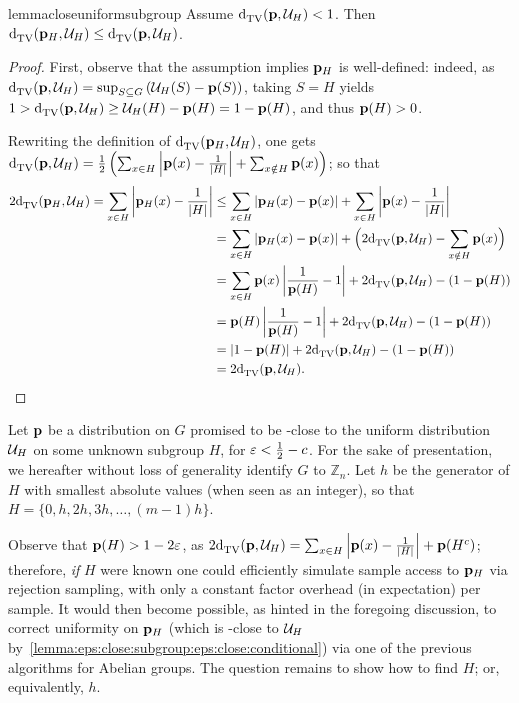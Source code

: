 \begin{restatable}{lemma}{closeuniformsubgroup}\label{lemma:eps:close:subgroup:eps:close:conditional}
Assume ${\operatorname{d}_{\textrm{TV}}^{}\!\left({\mathbf{p}, \mathcal{U}_H}\right)} < 1$. Then ${\operatorname{d}_{\textrm{TV}}^{}\!\left({\mathbf{p}_H, \mathcal{U}_H}\right)} \leq {\operatorname{d}_{\textrm{TV}}^{}\!\left({\ensuremath{\mathbf{p}}, \ensuremath{\mathcal{U}}_H}\right)}$.
\end{restatable}
\begin{proof}
  First, observe that the assumption implies $\mathbf{p}_H$ is well-defined: indeed, as 
  ${\operatorname{d}_{\textrm{TV}}^{}\!\left({\mathbf{p}, \mathcal{U}_H}\right)} = \sup_{S\subseteq G}\left( \mathcal{U}_H(S)-\mathbf{p}(S) \right)$, 
  taking $S=H$ yields $1 > {\operatorname{d}_{\textrm{TV}}^{}\!\left({\mathbf{p}, \mathcal{U}_H}\right)} \geq \mathcal{U}_H(H)-\mathbf{p}(H) = 1-\mathbf{p}(H)$, 
  and thus $\mathbf{p}(H) > 0$.

  Rewriting the definition of ${\operatorname{d}_{\textrm{TV}}^{}\!\left({\mathbf{p}_H, \mathcal{U}_H}\right)}$, one gets ${\operatorname{d}_{\textrm{TV}}^{}\!\left({\mathbf{p}, \mathcal{U}_H}\right)} = \frac{1}{2}\left( \sum_{x\in H} \left\lvert  \mathbf{p}(x) - \frac{1}{\left\lvert H \right\rvert}  \right\rvert + \sum_{x\notin H} \mathbf{p}(x)\right)$; so that
  \begin{align*}
    2{\operatorname{d}_{\textrm{TV}}^{}\!\left({\mathbf{p}_H, \mathcal{U}_H}\right)} = \sum_{x\in H} \left\lvert  \mathbf{p}_H(x) - \frac{1}{\left\lvert H \right\rvert}  \right\rvert 
    &\leq \sum_{x\in H} \left\lvert  \mathbf{p}_H(x) - \mathbf{p}(x)  \right\rvert  + \sum_{x\in H} \left\lvert  \mathbf{p}(x) - \frac{1}{\left\lvert H \right\rvert}  \right\rvert \\
    &= \sum_{x\in H} \left\lvert  \mathbf{p}_H(x) - \mathbf{p}(x)  \right\rvert  + \Big(2{\operatorname{d}_{\textrm{TV}}^{}\!\left({\mathbf{p}, \mathcal{U}_H}\right)} - \sum_{x\notin H} \mathbf{p}(x)\Big) \\
    &= \sum_{x\in H} \mathbf{p}(x)\left\lvert  \frac{1}{\mathbf{p}(H)} - 1  \right\rvert  + 2{\operatorname{d}_{\textrm{TV}}^{}\!\left({\mathbf{p}, \mathcal{U}_H}\right)} - \left(1-\mathbf{p}(H)\right) \\
    &= \mathbf{p}(H)\left\lvert  \frac{1}{\mathbf{p}(H)} - 1  \right\rvert  + 2{\operatorname{d}_{\textrm{TV}}^{}\!\left({\mathbf{p}, \mathcal{U}_H}\right)} - \left(1-\mathbf{p}(H)\right) \\
    &= \left\lvert 1-\mathbf{p}(H) \right\rvert + 2{\operatorname{d}_{\textrm{TV}}^{}\!\left({\mathbf{p}, \mathcal{U}_H}\right)} - \left(1-\mathbf{p}(H)\right)\\
    &= 2{\operatorname{d}_{\textrm{TV}}^{}\!\left({\mathbf{p}, \mathcal{U}_H}\right)}.
  \end{align*}
\end{proof}

Let $\mathbf{p}$ be a distribution on $G$ promised to be \eps-close to the uniform distribution $\mathcal{U}_H$ on some unknown subgroup $H$, for $\varepsilon < \frac{1}{2}-c$. For the sake of presentation, we hereafter without loss of generality identify $G$ to $\mathbb{Z}_n$. Let $h$ be the generator of $H$ with smallest absolute values (when seen as an integer), so that $H=\{0, h,2h,3h,\dots,(m-1)h\}$.

\noindent Observe that $\mathbf{p}(H) > 1-2\varepsilon$, as $2{\operatorname{d}_{\textrm{TV}}^{}\!\left({\mathbf{p}, \mathcal{U}_H}\right)} = \sum_{x\in H} \left\lvert  \mathbf{p}(x) - \frac{1}{\left\lvert H \right\rvert}  \right\rvert + \mathbf{p}(H^c)$; therefore, \emph{if} $H$ were known one could efficiently simulate sample access to $\mathbf{p}_H$ via rejection sampling, with only a constant factor overhead (in expectation) per sample. It would then become possible, as hinted in the foregoing discussion, to correct uniformity on $\mathbf{p}_H$ (which is \eps-close to $\mathcal{U}_H$ by~\cref{lemma:eps:close:subgroup:eps:close:conditional}) via one of the previous algorithms for Abelian groups. The question remains to show how to find $H$; or, equivalently, $h$.\medskip

